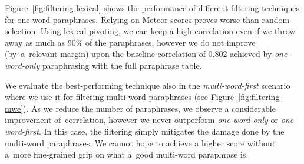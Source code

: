 \documentclass[11pt]{article}
\def\Fref#1{Figure~\ref{#1}}
\begin{document}
\Fref{fig:filtering-lexical} shows the performance of different filtering
techniques for one-word paraphrases. Relying on Meteor scores proves worse than
random selection. Using lexical pivoting, we can keep a high correlation even 
if we throw away as much as 90\% of the paraphrases, however we do not improve 
(by~a~relevant margin) upon the baseline correlation of 0.802 achieved by
\emph{one-word-only} paraphrasing with the full paraphrase table.

We evaluate the best-performing technique also in the \textit{multi-word-first}
scenario where we use it for filtering multi-word paraphrases (see
\Fref{fig:filtering-mwe}). As we reduce the number of paraphrases, we observe a
considerable improvement of~correlation, however we never outperform
\textit{one-word-only} or \textit{one-word-first}. In this case, the filtering
simply mitigates the damage done by the multi-word paraphrases. We
cannot hope to achieve a higher score without a~more fine-grained grip on what
a~good multi-word paraphrase is.
\end{document}
